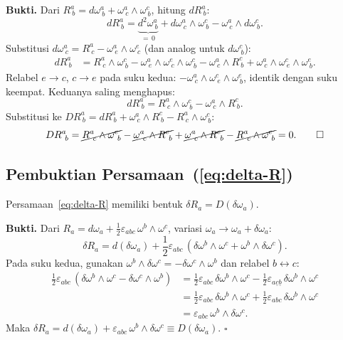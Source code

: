 \noindent\textbf{Bukti.} Dari $R^a_{\ b} = d\omega^a_{\ b} + \omega^a_{\ c} \wedge \omega^c_{\ b}$, hitung $dR^a_{\ b}$:
\begin{equation}
    dR^a_{\ b} = \underbrace{d^2\omega^a_{\ b}}_{=\,0} + d\omega^a_{\ c} \wedge \omega^c_{\ b} - \omega^a_{\ c} \wedge d\omega^c_{\ b}.
\end{equation}
Substitusi $d\omega^a_{\ c} = R^a_{\ c} - \omega^a_{\ e} \wedge \omega^e_{\ c}$ (dan analog untuk $d\omega^c_{\ b}$):
\begin{align}
    dR^a_{\ b} &= R^a_{\ c} \wedge \omega^c_{\ b} - \omega^a_{\ e} \wedge \omega^e_{\ c} \wedge \omega^c_{\ b} - \omega^a_{\ c} \wedge R^c_{\ b} + \omega^a_{\ c} \wedge \omega^c_{\ e} \wedge \omega^e_{\ b}.
\end{align}
Relabel $e \to c$, $c \to e$ pada suku kedua: $-\omega^a_{\ c} \wedge \omega^c_{\ e} \wedge \omega^e_{\ b}$, identik dengan suku keempat. Keduanya saling menghapus:
\begin{equation}
    dR^a_{\ b} = R^a_{\ c} \wedge \omega^c_{\ b} - \omega^a_{\ c} \wedge R^c_{\ b}.
\end{equation}
Substitusi ke $DR^a_{\ b} = dR^a_{\ b} + \omega^a_{\ c} \wedge R^c_{\ b} - R^a_{\ c} \wedge \omega^c_{\ b}$:
\begin{equation}
    DR^a_{\ b} = \cancel{R^a_{\ c} \wedge \omega^c_{\ b}} - \cancel{\omega^a_{\ c} \wedge R^c_{\ b}} + \cancel{\omega^a_{\ c} \wedge R^c_{\ b}} - \cancel{R^a_{\ c} \wedge \omega^c_{\ b}} = 0. \qquad\square
\end{equation}

\subsection{Pembuktian Persamaan~(\ref{eq:delta-R})}
\label{app:proof-delta-R}
 
Persamaan~\eqref{eq:delta-R} memiliki bentuk $\delta R_a = D(\delta\omega_a)$.
 
\bigskip\noindent\textbf{Bukti.} Dari $R_a = d\omega_a + \frac{1}{2}\varepsilon_{abc}\,\omega^b \wedge \omega^c$, variasi $\omega_a \to \omega_a + \delta\omega_a$:
\begin{equation}
    \delta R_a = d(\delta\omega_a) + \frac{1}{2}\varepsilon_{abc}\,(\delta\omega^b \wedge \omega^c + \omega^b \wedge \delta\omega^c).
\end{equation}
Pada suku kedua, gunakan $\omega^b \wedge \delta\omega^c = -\delta\omega^c \wedge \omega^b$ dan relabel $b \leftrightarrow c$:
\begin{align}
    \frac{1}{2}\varepsilon_{abc}\,(\delta\omega^b \wedge \omega^c - \delta\omega^c \wedge \omega^b)
    &= \frac{1}{2}\varepsilon_{abc}\,\delta\omega^b \wedge \omega^c - \frac{1}{2}\varepsilon_{a\underline{c}\underline{b}}\,\delta\omega^b \wedge \omega^c \nonumber\\
    &= \frac{1}{2}\varepsilon_{abc}\,\delta\omega^b \wedge \omega^c + \frac{1}{2}\varepsilon_{abc}\,\delta\omega^b \wedge \omega^c \nonumber\\
    &= \varepsilon_{abc}\,\omega^b \wedge \delta\omega^c.
\end{align}
Maka $\delta R_a = d(\delta\omega_a) + \varepsilon_{abc}\,\omega^b \wedge \delta\omega^c \equiv D(\delta\omega_a)$. $\square$
 
